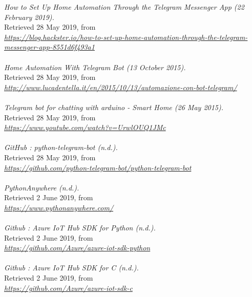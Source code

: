 \documentclass[a4paper]{article}
\begin{document}
		\emph{How to Set Up Home Automation Through the Telegram Messenger App (22 February 2019).} \\
		Retrieved 28 May 2019, from \\
		\textit{\href{https://blog.hackster.io/how-to-set-up-home-automation-through-the-telegram-messenger-app-8551d6f493a1}
		{https://blog.hackster.io/how-to-set-up-home-automation-through-the-telegram-messenger-app-8551d6f493a1}}\\
		\\
		\emph{Home Automation With Telegram Bot (13 October 2015).} \\
		Retrieved 28 May 2019, from \\
		\textit{\href{http://www.lucadentella.it/en/2015/10/13/automazione-con-bot-telegram/}
			{http://www.lucadentella.it/en/2015/10/13/automazione-con-bot-telegram/}}\\
		\\
		\emph{Telegram bot for chatting with arduino - Smart Home (26 May 2015).} \\
		Retrieved 28 May 2019, from \\
		\textit{\href{https://www.youtube.com/watch?v=UrwlOUQ1JMc}
			{https://www.youtube.com/watch?v=UrwlOUQ1JMc}}\\
		\\
		\emph{GitHub : python-telegram-bot (n.d.).} \\
		Retrieved 28 May 2019, from \\
		\textit{\href{https://github.com/python-telegram-bot/python-telegram-bot}
			{https://github.com/python-telegram-bot/python-telegram-bot}}\\
		\\
		\emph{PythonAnywhere (n.d.).} \\
		Retrieved 2 June 2019, from \\
		\textit{\href{https://www.pythonanywhere.com/}
			{https://www.pythonanywhere.com/}}\\
		\\
		\emph{Github : Azure IoT Hub SDK for Python (n.d.).} \\
		Retrieved 2 June 2019, from \\
		\textit{\href{https://github.com/Azure/azure-iot-sdk-python}
			{https://github.com/Azure/azure-iot-sdk-python}}\\
		\\
		\emph{Github : Azure IoT Hub SDK for C (n.d.).} \\
		Retrieved 2 June 2019, from \\
		\textit{\href{https://github.com/Azure/azure-iot-sdk-c}
			{https://github.com/Azure/azure-iot-sdk-c}}		


	\listoffigures
	\listoftables
\end{document}
